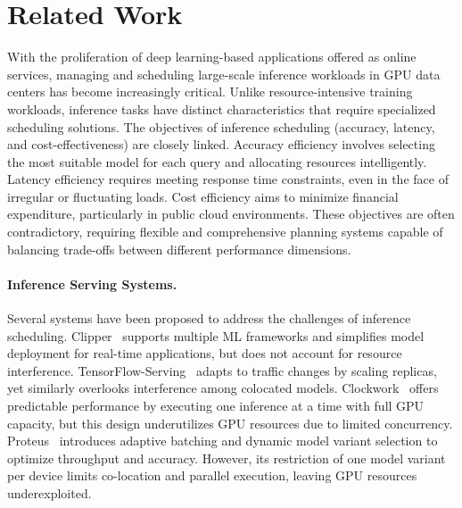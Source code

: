 \section{Related Work}\label{sec:related}

With the proliferation of deep learning-based applications offered as online services, managing and scheduling large-scale inference workloads in GPU data centers has become increasingly critical. Unlike resource-intensive training workloads, inference tasks have distinct characteristics that require specialized scheduling solutions. The objectives of inference scheduling (accuracy, latency, and cost-effectiveness) are closely linked. Accuracy efficiency involves selecting the most suitable model for each query and allocating resources intelligently. Latency efficiency requires meeting response time constraints, even in the face of irregular or fluctuating loads. Cost efficiency aims to minimize financial expenditure, particularly in public cloud environments. These objectives are often contradictory, requiring flexible and comprehensive planning systems capable of balancing trade-offs between different performance dimensions.

\paragraph{Inference Serving Systems.}
Several systems have been proposed to address the challenges of inference scheduling. Clipper~\cite{2017Clipper} supports multiple ML frameworks and simplifies model deployment for real-time applications, but does not account for resource interference. TensorFlow-Serving~\cite{olston2017tensorflow} adapts to traffic changes by scaling replicas, yet similarly overlooks interference among colocated models. Clockwork~\cite{gujarati2020servingDNNlikeclockwork} offers predictable performance by executing one inference at a time with full GPU capacity, but this design underutilizes GPU resources due to limited concurrency. Proteus~\cite{ahmad2024proteus} introduces adaptive batching and dynamic model variant selection to optimize throughput and accuracy. However, its restriction of one model variant per device limits co-location and parallel execution, leaving GPU resources underexploited.

